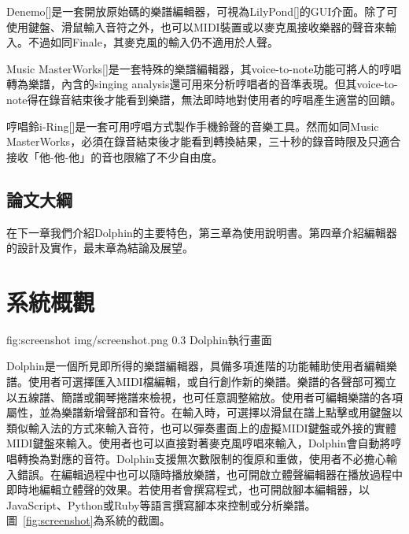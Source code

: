 \documentclass[12pt,a4paper,oneside]{report}
\begin{document}
Denemo[]是一套開放原始碼的樂譜編輯器，可視為LilyPond[]的GUI介面。除了可使用鍵盤、滑鼠輸入音符之外，也可以MIDI裝置或以麥克風接收樂器的聲音來輸入。不過如同Finale，其麥克風的輸入仍不適用於人聲。

Music MasterWorks[]是一套特殊的樂譜編輯器，其voice-to-note功能可將人的哼唱轉為樂譜，內含的singing analysis還可用來分析哼唱者的音準表現。但其voice-to-note得在錄音結束後才能看到樂譜，無法即時地對使用者的哼唱產生適當的回饋。

哼唱鈴i-Ring[]是一套可用哼唱方式製作手機鈴聲的音樂工具。然而如同Music MasterWorks，必須在錄音結束後才能看到轉換結果，三十秒的錄音時限及只適合接收「他-他-他」的音也限縮了不少自由度。

\section{論文大綱}

在下一章我們介紹Dolphin的主要特色，第三章為使用說明書。第四章介紹編輯器的設計及實作，最末章為結論及展望。

\chapter{系統概觀}


\figurewithcaption
{fig:screenshot}
{img/screenshot.png}
{0.3}
{Dolphin執行畫面}

Dolphin是一個所見即所得的樂譜編輯器，具備多項進階的功能輔助使用者編輯樂譜。使用者可選擇匯入MIDI檔編輯，或自行創作新的樂譜。樂譜的各聲部可獨立以五線譜、簡譜或鋼琴捲譜來檢視，也可任意調整縮放。使用者可編輯樂譜的各項屬性，並為樂譜新增聲部和音符。在輸入時，可選擇以滑鼠在譜上點擊或用鍵盤以類似輸入法的方式來輸入音符，也可以彈奏畫面上的虛擬MIDI鍵盤或外接的實體MIDI鍵盤來輸入。使用者也可以直接對著麥克風哼唱來輸入，Dolphin會自動將哼唱轉換為對應的音符。Dolphin支援無次數限制的復原和重做，使用者不必擔心輸入錯誤。在編輯過程中也可以隨時播放樂譜，也可開啟立體聲編輯器在播放過程中即時地編輯立體聲的效果。若使用者會撰寫程式，也可開啟腳本編輯器，以JavaScript、Python或Ruby等語言撰寫腳本來控制或分析樂譜。圖~\ref{fig:screenshot}為系統的截圖。
\end{document}
